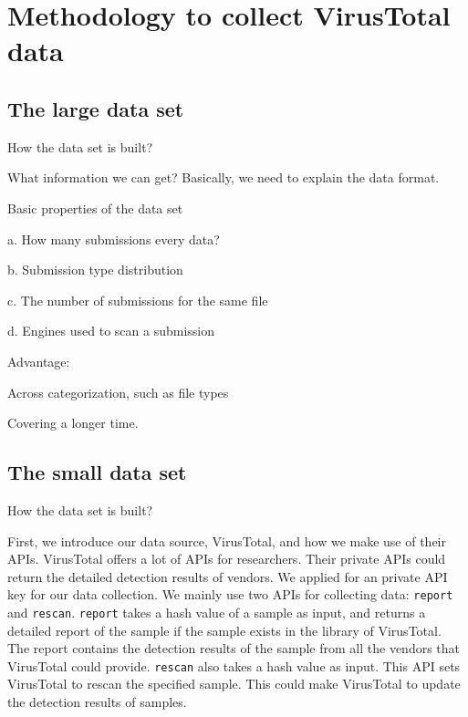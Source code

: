 \section{Methodology to collect VirusTotal data}

\subsection{The large data set}

How the data set is built?

What information we can get? Basically, we need to explain the data format. 

Basic properties of the data set

a. How many submissions every data?

b. Submission type distribution

c. The number of submissions for the same file

d. Engines used to scan a submission 

Advantage: 

Across categorization, such as file types 

Covering a longer time.


\subsection{The small data set}

How the data set is built?

First, we introduce our data source, VirusTotal, and how we make use of their APIs. VirusTotal offers a lot of APIs for researchers. Their private APIs could return the detailed detection results of vendors. We applied for an private API key for our data collection. We mainly use two APIs for collecting data: \texttt{report} and \texttt{rescan}. \texttt{report} takes a hash value of a sample as input, and returns a detailed report of the sample if the sample exists in the library of VirusTotal. The report contains the detection results of the sample from all the vendors that VirusTotal could provide. \texttt{rescan} also takes a hash value as input. This API sets VirusTotal to rescan the specified sample. This could make VirusTotal to update the detection results of samples.

